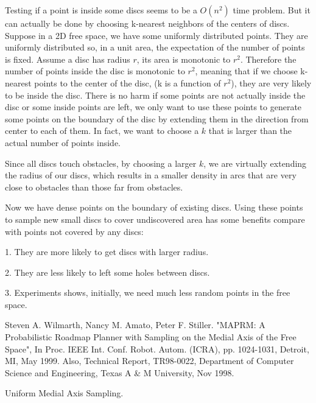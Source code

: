 \documentclass[12pt]{article}
\begin{document}
  Testing if a point is inside some discs seems to be a $O(n^2)$ time problem. But it can actually be done by choosing k-nearest neighbors of the centers of discs. Suppose in a 2D free space, we have some uniformly distributed points. They are uniformly distributed so, in a unit area, the expectation of the number of points is fixed. Assume a disc has radius $r$, its area is monotonic to $r^2$. Therefore the number of points inside the disc is monotonic to $r^2$, meaning that if we choose k-nearest points to the center of the disc, (k is a function of $r^2$), they are very likely to be inside the disc. There is no harm if some points are not actually inside the disc or some inside points are left, we only want to use these points to generate some points on the boundary of the disc by extending them in the direction from center to each of them. In fact, we want to choose a $k$ that is larger than the actual number of points inside.
  
  Since all discs touch obstacles, by choosing a larger $k$, we are virtually extending the radius of our discs, which results in a smaller density in arcs that are very close to obstacles than those far from obstacles.
  
  Now we have dense points on the boundary of existing discs. Using these points to sample new small discs to cover undiscovered area has some benefits compare with points not covered by any discs:
  
  1. They are more likely to get discs with larger radius. 
  
  2. They are less likely to left some holes between discs. 
  
  3. Experiments shows, initially, we need much less random points in the free space.
  
  \begin{thebibliography}{1}

   Steven A. Wilmarth, Nancy M. Amato, Peter F. Stiller. "MAPRM: A Probabilistic Roadmap Planner with Sampling on the Medial Axis of the Free Space", In Proc. IEEE Int. Conf. Robot. Autom. (ICRA), pp. 1024-1031, Detroit, MI, May 1999. Also, Technical Report, TR98-0022, Department of Computer Science and Engineering, Texas A \& M University, Nov 1998.
  
   Uniform Medial Axis Sampling.
   
  \end{thebibliography}
  
\end{document}

